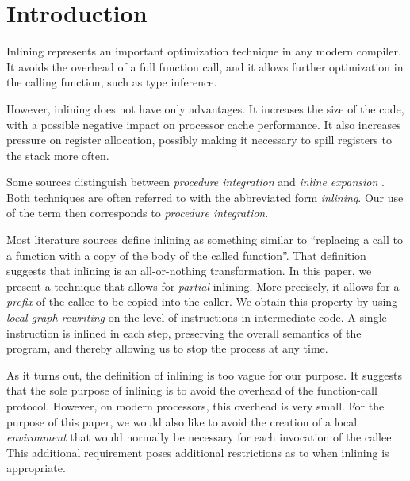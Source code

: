 \section{Introduction}

Inlining represents an important optimization technique in any modern
compiler.  It avoids the overhead of a full function call, and it
allows further optimization in the calling function, such as type
inference.

However, inlining does not have only advantages.  It increases the
size of the code, with a possible negative impact on processor cache
performance.  It also increases pressure on register allocation,
possibly making it necessary to spill registers to the stack more
often.

Some sources distinguish between \emph{procedure integration} and
\emph{inline expansion} \cite{Muchnick:1998:ACD:286076}.  Both
techniques are often referred to with the abbreviated form
\emph{inlining}.  Our use of the term then corresponds to
\emph{procedure integration}.

Most literature sources define inlining as something similar to
``replacing a call to a function with a copy of the body of the called
function''.  That definition suggests that inlining is an
all-or-nothing transformation.  In this paper, we present a technique
that allows for \emph{partial} inlining.  More precisely, it allows
for a \emph{prefix} of the callee to be copied into the caller.  We
obtain this property by using \emph{local graph rewriting} on the
level of instructions in intermediate code.  A single instruction is
inlined in each step, preserving the overall semantics of the program,
and thereby allowing us to stop the process at any time.

As it turns out, the definition of inlining is too vague for our
purpose.  It suggests that the sole purpose of inlining is to avoid
the overhead of the function-call protocol.  However, on modern
processors, this overhead is very small.  For the purpose of this
paper, we would also like to avoid the creation of a local
\emph{environment} that would normally be necessary for each
invocation of the callee.  This additional requirement poses
additional restrictions as to when inlining is appropriate.
